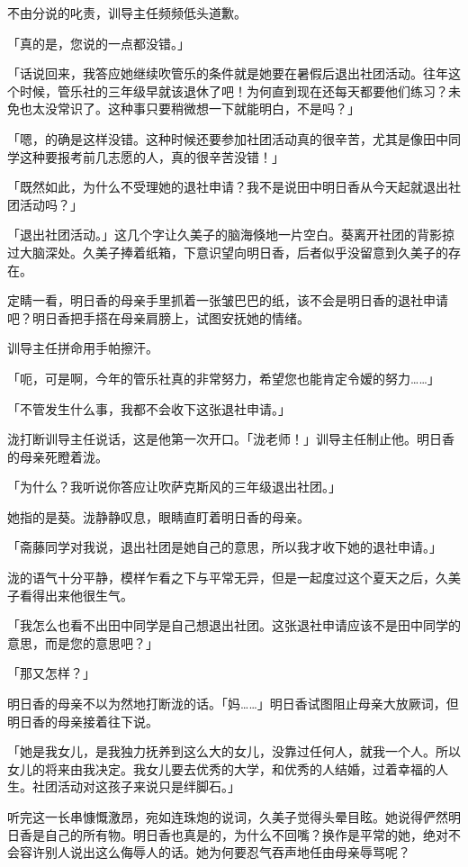 \documentclass[UTF8]{ctexart}
\begin{document}
    不由分说的叱责，训导主任频频低头道歉。 

    「真的是，您说的一点都没错。」 

    「话说回来，我答应她继续吹管乐的条件就是她要在暑假后退出社团活动。往年这个时候，管乐社的三年级早就该退休了吧！为何直到现在还每天都要他们练习？未免也太没常识了。这种事只要稍微想一下就能明白，不是吗？」 

    「嗯，的确是这样没错。这种时候还要参加社团活动真的很辛苦，尤其是像田中同学这种要报考前几志愿的人，真的很辛苦没错！」 

    「既然如此，为什么不受理她的退社申请？我不是说田中明日香从今天起就退出社团活动吗？」 

    「退出社团活动。」这几个字让久美子的脑海倏地一片空白。葵离开社团的背影掠过大脑深处。久美子捧着纸箱，下意识望向明日香，后者似乎没留意到久美子的存在。 

    定睛一看，明日香的母亲手里抓着一张皱巴巴的纸，该不会是明日香的退社申请吧？明日香把手搭在母亲肩膀上，试图安抚她的情绪。 

    训导主任拼命用手帕擦汗。 

    「呃，可是啊，今年的管乐社真的非常努力，希望您也能肯定令嫒的努力……」 

    「不管发生什么事，我都不会收下这张退社申请。」 

    泷打断训导主任说话，这是他第一次开口。「泷老师！」训导主任制止他。明日香的母亲死瞪着泷。 

    「为什么？我听说你答应让吹萨克斯风的三年级退出社团。」 

    她指的是葵。泷静静叹息，眼睛直盯着明日香的母亲。 

    「斋藤同学对我说，退出社团是她自己的意思，所以我才收下她的退社申请。」 

    泷的语气十分平静，模样乍看之下与平常无异，但是一起度过这个夏天之后，久美子看得出来他很生气。 

    「我怎么也看不出田中同学是自己想退出社团。这张退社申请应该不是田中同学的意思，而是您的意思吧？」 

    「那又怎样？」 

    明日香的母亲不以为然地打断泷的话。「妈……」明日香试图阻止母亲大放厥词，但明日香的母亲接着往下说。 

    「她是我女儿，是我独力抚养到这么大的女儿，没靠过任何人，就我一个人。所以女儿的将来由我决定。我女儿要去优秀的大学，和优秀的人结婚，过着幸福的人生。社团活动对这孩子来说只是绊脚石。」 

    听完这一长串慷慨激昂，宛如连珠炮的说词，久美子觉得头晕目眩。她说得俨然明日香是自己的所有物。明日香也真是的，为什么不回嘴？换作是平常的她，绝对不会容许别人说出这么侮辱人的话。她为何要忍气吞声地任由母亲辱骂呢？ 
\end{document}

